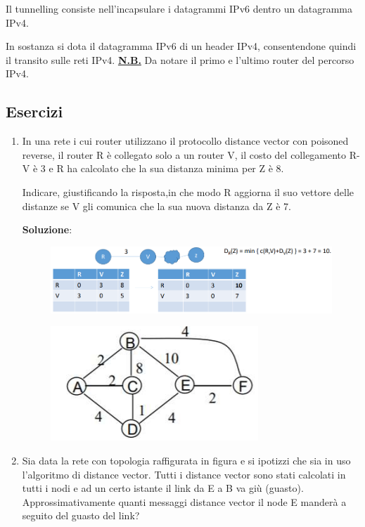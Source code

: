 \documentclass[11pt,a4paper,oneside]{book}
\theoremstyle{definition}
\begin{document}
Il tunnelling consiste nell'incapsulare i datagrammi IPv6 dentro un datagramma IPv4.

In sostanza si dota il datagramma IPv6 di un header IPv4, consentendone quindi il transito sulle reti IPv4. \textbf{\underline{N.B.}} Da notare il primo e l'ultimo router del percorso IPv4.

\subsection{Esercizi}


\begin{enumerate}
	\item In una rete i cui router utilizzano il protocollo distance vector con
	      poisoned reverse, il router R è collegato solo a un router V, il costo del
	      collegamento R-V è 3 e R ha calcolato che la sua distanza minima per
	      Z è 8.

	      Indicare, giustificando la risposta,in che modo R aggiorna il
	      suo vettore delle distanze se V gli comunica che la sua nuova distanza
	      da Z è 7.

	      \textbf{Soluzione}:
	      \begin{figure}[!h]
		      \centering
		      \includegraphics[scale=0.45]{Immagini/Sol_rout.png}
	      \end{figure}

	      \pagebreak

	      \begin{figure}[!h]
		      \centering
		      \includegraphics[scale=0.45]{Immagini/Rout_imm.png}
	      \end{figure}

	\item Sia data la rete con topologia raffigurata in figura e si
	      ipotizzi che sia in uso l’algoritmo di distance vector.
	      Tutti i distance vector sono stati calcolati in tutti i nodi
	      e ad un certo istante il link da E a B va giù (guasto).
	      Approssimativamente quanti messaggi distance vector
	      il node E manderà a seguito del guasto del link?


\end{enumerate}
\end{document}

